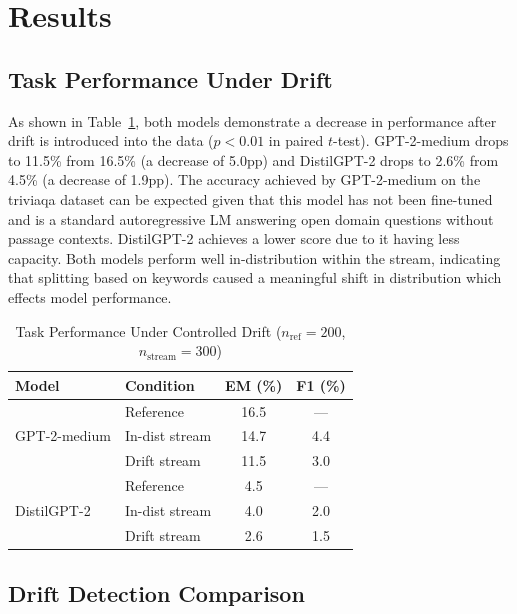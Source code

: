 \documentclass[12pt,a4paper]{article}
\begin{document}
\section{Results}
\label{sec:results}




\subsection{Task Performance Under Drift}

As shown in Table~\ref{tab:task_perf}, both models demonstrate a decrease in performance after drift is introduced into the data ($p<0.01$ in paired $t$-test). GPT-2-medium drops to 11.5\% from 16.5\% (a decrease of 5.0pp) and DistilGPT-2 drops to 2.6\% from 4.5\% (a decrease of 1.9pp). The accuracy achieved by GPT-2-medium on the triviaqa dataset can be expected given that this model has not been fine-tuned and is a standard autoregressive LM answering open domain questions without passage contexts. DistilGPT-2 achieves a lower score due to it having less capacity. Both models perform well in-distribution within the stream, indicating that splitting based on keywords caused a meaningful shift in distribution which effects model performance.

\begin{table}[htbp]
\caption{Task Performance Under Controlled Drift ($n_\mathrm{ref}=200$, $n_\mathrm{stream}=300$)}
\label{tab:task_perf}
\centering
\begin{tabular}{llcc}
\toprule
\textbf{Model} & \textbf{Condition} & \textbf{EM (\%)} & \textbf{F1 (\%)} \\
\midrule
\multirow{3}{*}{GPT-2-medium}
  & Reference       & 16.5 & — \\
  & In-dist stream  & 14.7 & 4.4 \\
  & Drift stream    & 11.5 & 3.0 \\
\midrule
\multirow{3}{*}{DistilGPT-2}
  & Reference       & 4.5  & — \\
  & In-dist stream  & 4.0  & 2.0 \\
  & Drift stream    & 2.6  & 1.5 \\
\bottomrule
\end{tabular}
\end{table}

\subsection{Drift Detection Comparison}
\end{document}
